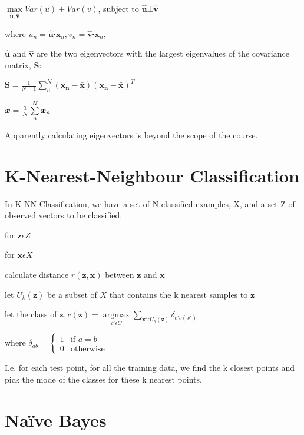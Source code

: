\documentclass[10pt,a4paper]{article}
\newcommand{\bh}[1]{\bm{\hat{#1}}}
\newcommand{\su}[2]{\sum\limits_{#1}^{#2}}
\newcommand{\re}[1]{\frac{1}{#1}}
\newcommand{\samplemean}[2]{\re{#2}\su{\MakeLowercase{#2}}{#2}#1_{\MakeLowercase{#2}}}
\begin{document}
	\begin{center}
		$
			\max\limits_{\bh u, \bh v} Var(u) + Var(v)$, subject to $\bh u \bot \bh v 
			$ 
			
			where 
			$ u_n = \bh u \centerdot \bm x_n, v_n = \bh v \centerdot \bm x_n, 
		$
	\end{center}
	
	$\bh u$ and $\bh v$ are the two eigenvectors with the largest eigenvalues of the covariance matrix, $\bm S$:
	
	\begin{center}
		$ \bm S = \re{N-1}\su{n}{N}(\bm{x_n} - \bm{\bar x})(\bm{x_n} - \bm{\bar x})^T $
		
		$ \bm{\bar x} = \samplemean{\bm x}{N} $
	\end{center}
	
	Apparently calculating eigenvectors is beyond the scope of the course.
	
	\section{K-Nearest-Neighbour Classification}
	
	In K-NN Classification, we have a set of N classified examples, X, and a set Z of observed vectors to be classified.
	
	for $\bm z \epsilon Z$
	
	\quad \quad for $\bm x \epsilon X$
	
	\quad \quad \quad \quad calculate distance $r(\bm z, \bm x)$ between $\bm z$ and $\bm x $
	
	
	\quad \quad let $U_k(\bm z)$ be a subset of $X$ that contains the k nearest samples to $\bm z$
	
	\quad \quad let the class of $\bm z, c(\bm z) = \mathop{argmax} \limits_{c' \epsilon  C} \su{\bm x' \epsilon U_k(\bm z)}{} \delta_{c' c(x')}$
	

	\begin{center}
		where 
		{\small 
		$\delta_{ab} = 	 \begin{cases} 1 & \mbox{if } a=b \\ 0 & \mbox{otherwise} \end{cases} $
	}
	\end{center}
	
	I.e. for each test point, for all the training data, we find the k closest points and pick the mode of the classes for these k nearest points.
	
	\section{Naïve Bayes}
	
\end{document}
